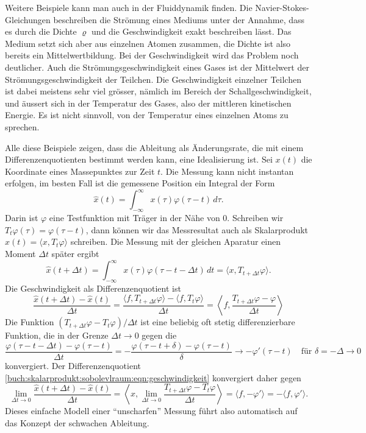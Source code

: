 Weitere Beispiele kann man auch in der Fluiddynamik finden.
Die Navier-Stokes-Gleichungen beschreiben die Strömung eines Mediums
unter der Annahme, dass es durch die Dichte $\varrho$ und die
Geschwindigkeit exakt beschreiben lässt.
Das Medium setzt sich aber aus einzelnen Atomen zusammen, die Dichte
ist also bereits ein Mittelwertbildung.
Bei der Geschwindigkeit wird das Problem noch deutlicher.
Auch die Strömungsgeschwindigkeit eines Gases ist der Mittelwert der
Strömungsgeschwindigkeit der Teilchen. 
Die Geschwindigkeit einzelner Teilchen ist dabei meistens sehr viel
grösser, nämlich im Bereich der Schallgeschwindigkeit, und äussert sich
in der Temperatur des Gases, also der mittleren kinetischen Energie.
Es ist nicht sinnvoll, von der Temperatur eines einzelnen Atoms zu
sprechen.

Alle diese Beispiele zeigen, dass die Ableitung als Änderungsrate, die
mit einem Differenzenquotienten bestimmt werden kann, eine Idealisierung
ist.
Sei $x(t)$ die Koordinate eines Massepunktes zur Zeit $t$.
Die Messung kann nicht instantan erfolgen, im besten Fall ist die
gemessene Position ein Integral der Form
\[
\hat{x}(t)
=
\int_{-\infty}^\infty x(\tau) \varphi(\tau - t)\,d\tau.
\]
Darin ist $\varphi$ eine Testfunktion mit Träger in der Nähe von $0$.
Schreiben wir $T_t\varphi(\tau) = \varphi(\tau -t)$, dann können wir
das Messresultat auch als Skalarprodukt
$\hat{x}(t)=\langle x,T_t\varphi\rangle$
schreiben.
Die Messung mit der gleichen Aparatur einen Moment $\Delta t$ später ergibt
\[
\hat{x}(t+\Delta t)
=
\int_{-\infty}^\infty x(\tau) \varphi(\tau-t-\Delta t)\,dt
=
\langle x, T_{t+\Delta t}\varphi\rangle.
\]
Die Geschwindigkeit als Differenzenquotient ist
\begin{equation}
\frac{
\hat{x}(t+\Delta t)-\hat{x}(t)
}{\Delta t}
=
\frac{
\langle f,T_{t+\Delta t}\varphi\rangle
-
\langle f,T_{t}\varphi\rangle
}{
\Delta t
}
=
\left\langle
f,\frac{T_{t+\Delta t}\varphi - \varphi}{\Delta t}
\right\rangle
\label{buch:skalarprodukt:sobolevlraum:eqn:geschwindigkeit}
\end{equation}
Die Funktion $(T_{t+\Delta t}\varphi-T_t\varphi)/\Delta t$ ist eine 
beliebig oft stetig differenzierbare Funktion, die in der Grenze
$\Delta t\to 0$ gegen die
\[
\frac{
\varphi(\tau - t - \Delta t)
-
\varphi(\tau - t)
}{
\Delta t
}
=
-
\frac{
\varphi(\tau - t + \delta) - \varphi(\tau - t)
}{
\delta
}
\to 
-
\varphi'(\tau - t)
\quad
\text{für $\delta = - \Delta \to 0$}
\]
konvergiert.
Der Differenzenquotient
\eqref{buch:skalarprodukt:sobolevlraum:eqn:geschwindigkeit}
konvergiert daher gegen
\[
\lim_{\Delta t\to 0}
\frac{
\hat{x}(t+\Delta t)-\hat{x}(t)
}{\Delta t}
=
\left\langle
x,
\lim_{\Delta t\to 0}
\frac{T_{t+\Delta t}\varphi-T_t\varphi}{\Delta t}
\right\rangle
=
\langle f,-\varphi'\rangle
=
-
\langle f, \varphi'\rangle.
\]
Dieses einfache Modell einer ``unscharfen'' Messung führt also automatisch
auf das Konzept der schwachen Ableitung.






